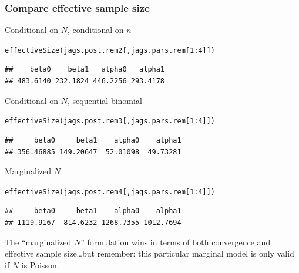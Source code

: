 \documentclass[color=usenames,dvipsnames]{beamer}\usepackage[]{graphicx}\usepackage[]{color}
\makeatletter
\newcommand{\hlnum}[1]{\textcolor[rgb]{0.69,0.494,0}{#1}}%
\newcommand{\hlopt}[1]{\textcolor[rgb]{0,0,0}{#1}}%
\newcommand{\hlstd}[1]{\textcolor[rgb]{0,0,0}{#1}}%
\newcommand{\hlkwd}[1]{\textcolor[rgb]{0.004,0.004,0.506}{#1}}%
\newenvironment{kframe}{%
 \def\at@end@of@kframe{}%
 \ifinner\ifhmode%
  \def\at@end@of@kframe{\end{minipage}}%
  \begin{minipage}{\columnwidth}%
 \fi\fi%
 \def\FrameCommand##1{\hskip\@totalleftmargin \hskip-\fboxsep
 \colorbox{shadecolor}{##1}\hskip-\fboxsep
     \hskip-\linewidth \hskip-\@totalleftmargin \hskip\columnwidth}%
 \MakeFramed {\advance\hsize-\width
   \@totalleftmargin\z@ \linewidth\hsize
   \@setminipage}}%
 {\par\unskip\endMakeFramed%
 \at@end@of@kframe}
\newenvironment{knitrout}{}{} %
\makeatother
\begin{document}
\begin{frame}[fragile]
  \frametitle{Compare effective sample size}
  \small
  Conditional-on-$N$, conditional-on-$n$
  \vspace{-6pt}
\begin{knitrout}\scriptsize
{}\color{fgcolor}\begin{kframe}
\begin{alltt}
\hlkwd{effectiveSize}\hlstd{(jags.post.rem2[,jags.pars.rem[}\hlnum{1}\hlopt{:}\hlnum{4}\hlstd{]])}
\end{alltt}
\begin{verbatim}
##    beta0    beta1   alpha0   alpha1 
## 483.6140 232.1824 446.2256 293.4178
\end{verbatim}
\end{kframe}
\end{knitrout}
  Conditional-on-$N$, sequential binomial
  \vspace{-6pt}
\begin{knitrout}\scriptsize
{}\color{fgcolor}\begin{kframe}
\begin{alltt}
\hlkwd{effectiveSize}\hlstd{(jags.post.rem3[,jags.pars.rem[}\hlnum{1}\hlopt{:}\hlnum{4}\hlstd{]])}
\end{alltt}
\begin{verbatim}
##     beta0     beta1    alpha0    alpha1 
## 356.46885 149.20647  52.01098  49.73281
\end{verbatim}
\end{kframe}
\end{knitrout}
  Marginalized $N$
  \vspace{-6pt}
\begin{knitrout}\scriptsize
{}\color{fgcolor}\begin{kframe}
\begin{alltt}
\hlkwd{effectiveSize}\hlstd{(jags.post.rem4[,jags.pars.rem[}\hlnum{1}\hlopt{:}\hlnum{4}\hlstd{]])}
\end{alltt}
\begin{verbatim}
##     beta0     beta1    alpha0    alpha1 
## 1119.9167  814.6232 1268.7355 1012.7694
\end{verbatim}
\end{kframe}
\end{knitrout}
\pause
\centering
\small
The ``marginalized $N$'' formulation wins in terms of both convergence and
effective sample size\pause\dots but remember: this particular
marginal model is only valid if $N$ is Poisson. \\ 
\end{frame}
\end{document}

